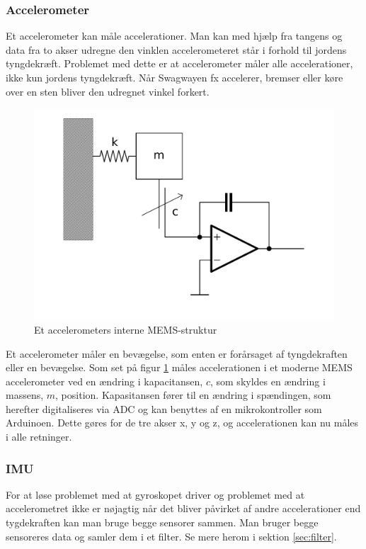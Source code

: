 \documentclass[a4paper,11pt,oneside,article,danish,table]{memoir}
\begin{document}
\subsubsection{Accelerometer}
Et accelerometer kan måle accelerationer. Man kan med hjælp fra tangens og data fra to akser udregne den vinklen accelerometeret står i forhold til jordens tyngdekræft. Problemet med dette er at accelerometer måler alle accelerationer, ikke kun jordens tyngdekræft. Når Swagwayen fx accelerer, bremser eller køre over en sten bliver den udregnet vinkel forkert.
\begin{figure}[htbp]
  \centering
  \includegraphics[width=\textwidth]{pictures/accbasic.pdf}
  \caption{Et accelerometers interne MEMS-struktur}
  \label{fig:memsacc}
\end{figure}
Et accelerometer måler en bevægelse, som enten er forårsaget af tyngdekraften eller en bevægelse. Som set på figur \ref{fig:memsacc} måles accelerationen i et moderne MEMS accelerometer ved en ændring i kapacitansen, $c$, som skyldes en ændring i massens, $m$, position. Kapasitansen fører til en ændring i spændingen, som herefter digitaliseres via ADC og kan benyttes af en mikrokontroller som Arduinoen. Dette gøres for de tre akser x, y og z, og accelerationen kan nu måles i alle retninger.

\subsubsection{IMU}
For at løse problemet med at gyroskopet driver og problemet med at accelerometret ikke er nøjagtig når det bliver påvirket af andre accelerationer end tygdekraften kan man bruge begge sensorer sammen. Man bruger begge sensoreres data og samler dem i et filter. Se mere herom i sektion \ref{sec:filter}.
\end{document}
